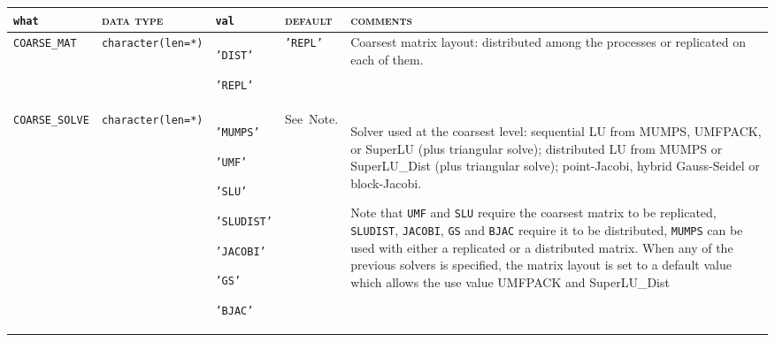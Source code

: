 \bsideways
\begin{center}
\begin{tabular}{|p{3.9cm}|l|p{1.7cm}|p{1.7cm}|p{8.6cm}|}
\hline
\verb|what|              & \textsc{data type}        &  \verb|val|      &  \textsc{default}  &
\textsc{comments} \\ \hline
\verb|COARSE_MAT|  & \verb|character(len=*)|
                         & \texttt{'DIST'} \par \texttt{'REPL'}
                         & \texttt{'REPL'}
                         & Coarsest matrix layout: distributed among the processes or
                           replicated on each of them. \\ \hline
\verb|COARSE_SOLVE| & \verb|character(len=*)|
                          & \texttt{'MUMPS'} \par \texttt{'UMF'} \par 
                           \texttt{'SLU'} \par \texttt{'SLUDIST'} \par 
                           \texttt{'JACOBI'} \par \texttt{'GS'} \par \texttt{'BJAC'} 
                         & See~Note.
                         & Solver used at the coarsest level: sequential
                           LU from MUMPS, UMFPACK, or SuperLU
                           (plus tri\-an\-gular solve); 
                           distributed LU from MUMPS or SuperLU\_Dist
                           (plus triangular solve);
                           point-Jacobi, hybrid Gauss-Seidel or block-Jacobi. \par
                           Note that \texttt{UMF} and \texttt{SLU} require the coarsest
                           matrix to be replicated, \texttt{SLUDIST},  \texttt{JACOBI},
                           \texttt{GS} and \texttt{BJAC} require it to be
                           distributed, \texttt{MUMPS} can be used with either
                           a replicated or a distributed matrix. When any of the previous
                          solvers is specified, the matrix layout is set to a default
                          value
                          which allows the use 
                          value UMFPACK and SuperLU\_Dist

\end{tabular}
\end{center}
